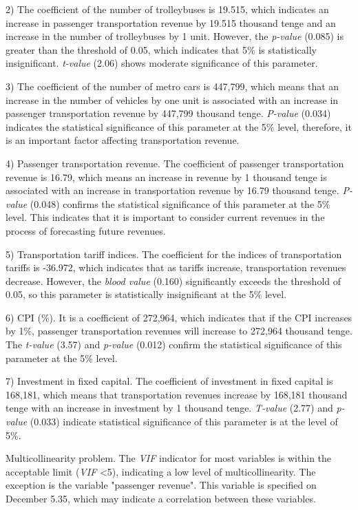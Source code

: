 2) The coefficient of the number of trolleybuses is 19.515, which
indicates an increase in passenger transportation revenue by 19.515
thousand tenge and an increase in the number of trolleybuses by 1 unit.
However, the \emph{p-value} (0.085) is greater than the threshold of
0.05, which indicates that 5\% is statistically insignificant.
\emph{t-value} (2.06) shows moderate significance of this parameter.

3) The coefficient of the number of metro cars is 447,799, which means
that an increase in the number of vehicles by one unit is associated
with an increase in passenger transportation revenue by 447,799 thousand
tenge. \emph{P-value} (0.034) indicates the statistical significance of
this parameter at the 5\% level, therefore, it is an important factor
affecting transportation revenue.

4) Passenger transportation revenue. The coefficient of passenger
transportation revenue is 16.79, which means an increase in revenue by 1
thousand tenge is associated with an increase in transportation revenue
by 16.79 thousand tenge. \emph{P-value} (0.048) confirms the statistical
significance of this parameter at the 5\% level. This indicates that it
is important to consider current revenues in the process of forecasting
future revenues.

5) Transportation tariff indices. The coefficient for the indices of
transportation tariffs is -36.972, which indicates that as tariffs
increase, transportation revenues decrease. However, the \emph{blood
value} (0.160) significantly exceeds the threshold of 0.05, so this
parameter is statistically insignificant at the 5\% level.

6) CPI (\%). It is a coefficient of 272,964, which indicates that if the
CPI increases by 1\%, passenger transportation revenues will increase to
272,964 thousand tenge. The \emph{t-value} (3.57) and \emph{p-value}
(0.012) confirm the statistical significance of this parameter at the
5\% level.

7) Investment in fixed capital. The coefficient of investment in fixed
capital is 168,181, which means that transportation revenues increase by
168,181 thousand tenge with an increase in investment by 1 thousand
tenge. \emph{T-value} (2.77) and \emph{p-value} (0.033) indicate
statistical significance of this parameter is at the level of 5\%.

Multicollinearity problem. The \emph{VIF} indicator for most variables
is within the acceptable limit (\emph{VIF} \textless5), indicating a low
level of multicollinearity. The exception is the variable "passenger
revenue". This variable is specified on December 5.35, which may
indicate a correlation between these variables.


